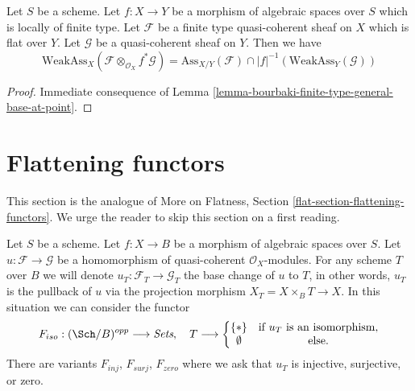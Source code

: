 \begin{lemma}
\label{lemma-bourbaki-finite-type-general-base}
Let $S$ be a scheme. Let $f : X \to Y$ be a morphism of algebraic spaces
over $S$ which is locally of finite type.
Let $\mathcal{F}$ be a finite type quasi-coherent sheaf on $X$
which is flat over $Y$. Let $\mathcal{G}$ be a quasi-coherent sheaf on $Y$.
Then we have
$$
\text{WeakAss}_X(\mathcal{F} \otimes_{\mathcal{O}_X} f^*\mathcal{G}) =
\text{Ass}_{X/Y}(\mathcal{F}) \cap
|f|^{-1}(\text{WeakAss}_Y(\mathcal{G}))
$$
\end{lemma}

\begin{proof}
Immediate consequence of
Lemma \ref{lemma-bourbaki-finite-type-general-base-at-point}.
\end{proof}







\section{Flattening functors}
\label{section-F-zero}

\noindent
This section is the analogue of
More on Flatness, Section \ref{flat-section-flattening-functors}.
We urge the reader to skip this section on a first reading.

\begin{situation}
\label{situation-iso}
Let $S$ be a scheme.
Let $f : X \to B$ be a morphism of algebraic spaces over $S$.
Let $u : \mathcal{F} \to \mathcal{G}$ be a homomorphism of
quasi-coherent $\mathcal{O}_X$-modules. For any scheme $T$ over
$B$ we will denote $u_T : \mathcal{F}_T \to \mathcal{G}_T$ the
base change of $u$ to $T$, in other words, $u_T$ is the pullback
of $u$ via the projection morphism $X_T = X \times_B T \to X$.
In this situation we can consider the functor
\begin{equation}
\label{equation-iso}
F_{iso} : (\Sch/B)^{opp} \longrightarrow \textit{Sets}, \quad
T \longrightarrow \left\{
\begin{matrix}
\{*\} & \text{if }u_T\text{ is an isomorphism}, \\
\emptyset & \text{else.}
\end{matrix}
\right.
\end{equation}
There are variants $F_{inj}$, $F_{surj}$, $F_{zero}$ where we ask that
$u_T$ is injective, surjective, or zero.
\end{situation}

